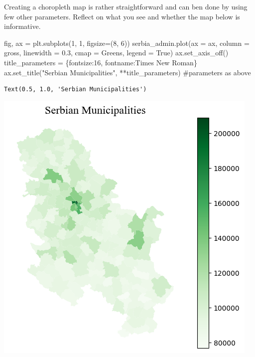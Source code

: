 \documentclass[
  letterpaper,
  DIV=11,
  numbers=noendperiod]{scrreprt}
\newenvironment{Shaded}{\begin{snugshade}}{\end{snugshade}}
\newcommand{\CommentTok}[1]{\textcolor[rgb]{0.37,0.37,0.37}{#1}}
\newcommand{\DecValTok}[1]{\textcolor[rgb]{0.68,0.00,0.00}{#1}}
\newcommand{\FloatTok}[1]{\textcolor[rgb]{0.68,0.00,0.00}{#1}}
\newcommand{\NormalTok}[1]{\textcolor[rgb]{0.00,0.23,0.31}{#1}}
\newcommand{\OperatorTok}[1]{\textcolor[rgb]{0.37,0.37,0.37}{#1}}
\newcommand{\StringTok}[1]{\textcolor[rgb]{0.13,0.47,0.30}{#1}}
\newcommand{\VariableTok}[1]{\textcolor[rgb]{0.07,0.07,0.07}{#1}}
\begin{document}
Creating a choropleth map is rather straightforward and can ben done by
using few other parameters. Reflect on what you see and whether the map
below is informative.

\begin{Shaded}
\begin{Highlighting}[]
\NormalTok{fig, ax }\OperatorTok{=}\NormalTok{ plt.subplots(}\DecValTok{1}\NormalTok{, }\DecValTok{1}\NormalTok{, figsize}\OperatorTok{=}\NormalTok{(}\DecValTok{8}\NormalTok{, }\DecValTok{6}\NormalTok{))}
\NormalTok{serbia\_admin.plot(ax }\OperatorTok{=}\NormalTok{ ax, column }\OperatorTok{=} \StringTok{\textquotesingle{}gross\textquotesingle{}}\NormalTok{, linewidth }\OperatorTok{=} \FloatTok{0.3}\NormalTok{, cmap }\OperatorTok{=} \StringTok{\textquotesingle{}Greens\textquotesingle{}}\NormalTok{, legend }\OperatorTok{=} \VariableTok{True}\NormalTok{)}
\NormalTok{ax.set\_axis\_off()}
\NormalTok{title\_parameters }\OperatorTok{=}\NormalTok{ \{}\StringTok{\textquotesingle{}fontsize\textquotesingle{}}\NormalTok{:}\StringTok{\textquotesingle{}16\textquotesingle{}}\NormalTok{, }\StringTok{\textquotesingle{}fontname\textquotesingle{}}\NormalTok{:}\StringTok{\textquotesingle{}Times New Roman\textquotesingle{}}\NormalTok{\}}
\NormalTok{ax.set\_title(}\StringTok{"Serbian Municipalities"}\NormalTok{, }\OperatorTok{**}\NormalTok{title\_parameters) }\CommentTok{\#parameters as above}
\end{Highlighting}
\end{Shaded}

\begin{verbatim}
Text(0.5, 1.0, 'Serbian Municipalities')
\end{verbatim}

\includegraphics{labs/w02_maps_files/figure-pdf/cell-28-output-2.png}
\end{document}
